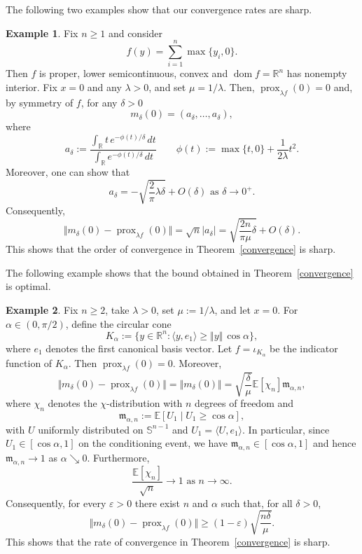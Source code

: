\documentclass[11pt]{amsart}
\newcommand{\1}{\mathds{1}}
\theoremstyle{definition}
\theoremstyle{remark}
\theoremstyle{definition}
\newtheorem{example}{Example}[section]
\begin{document}
The following two examples show that our convergence rates are sharp.
\begin{example}
    Fix $n\geq 1$ and consider
    $$
    f(y)=\sum_{i=1}^n \max\{y_i,0\}.
    $$
    Then $f$ is proper, lower semicontinuous, convex and $\operatorname{dom}f=\mathbb{R}^n$ has nonempty interior. Fix $x=0$ and any $\lambda>0$, and set $\mu=1/\lambda$. Then, $\operatorname{prox}_{\lambda f}(0)=0$ and, by symmetry of $f$, for any $\delta>0$
    $$
    m_{\delta}(0)=(a_{\delta},\ldots,a_{\delta}),
    $$
    where 
    $$
    a_{\delta}:=\frac{\int_{\mathbb{R}}t\,e^{-\phi(t)/\delta}\,dt}{\int_{\mathbb{R}}e^{-\phi(t)/\delta}\,dt} \qquad \phi(t):=\max\{t,0\}+\frac{1}{2\lambda}t^2.
    $$
    Moreover, one can show that 
    $$
    a_{\delta}=-\sqrt{\frac{2}{\pi}\lambda \delta}+O(\delta) \textrm{ as } \delta \to 0^+.
    $$
    Consequently,
    $$
    \Vert m_{\delta}(0)-\operatorname{prox}_{\lambda f}(0)\Vert =\sqrt{n}\vert a_{\delta}\vert=\sqrt{\frac{2n}{\pi \mu}\delta}+O(\delta).
    $$
    This shows that the order of convergence in Theorem~\ref{convergence} is sharp.
\end{example}
The following example shows that the bound obtained in Theorem~\ref{convergence} is optimal.
\begin{example} Fix $n\geq 2$, take $\lambda>0$, set $\mu:=1/\lambda$, and let $x=0$. For $\alpha\in (0,\pi/2)$, define the circular cone
$$
K_{\alpha}:=\{y\in \mathbb{R}^n \colon \langle y,e_1\rangle \geq \Vert y\Vert\, \cos \alpha\},
$$
where $e_1$ denotes the first canonical basis vector. 
Let $f=\iota_{K_{\alpha}}$ be the indicator function of $K_{\alpha}$. Then $\operatorname{prox}_{\lambda f}(0)=0$. Moreover,
$$
\Vert m_{\delta}(0)-\operatorname{prox}_{\lambda f}(0)\Vert =\Vert m_{\delta}(0)\Vert=\sqrt{\frac{\delta}{\mu}} \mathbb{E}[\chi_n] \mathfrak{m}_{\alpha,n},
$$
where $\chi_n$ denotes the $\chi$-distribution with $n$ degrees of freedom and 
$$
\mathfrak{m}_{\alpha,n}:=\mathbb{E}\left[U_1 \mid U_1\geq \cos \alpha\right],
$$
with $U$ uniformly distributed on $\mathbb{S}^{n-1}$ and $U_1=\langle U,e_1\rangle$. In particular, since $U_1\in [\cos \alpha,1]$ on the conditioning event, we have $\mathfrak{m}_{\alpha,n}\in [\cos \alpha,1]$ and hence   $\mathfrak{m}_{\alpha,n}\to 1$ as $\alpha \searrow 0$. Furthermore, 
$$
\frac{\mathbb{E}[\chi_n]}{\sqrt{n}}\to 1 \textrm{ as  } n\to \infty.
$$
Consequently, for every $\varepsilon>0$ there exist $n$ and $\alpha$ such that, for all $\delta>0$, 
$$
\Vert m_{\delta}(0)-\operatorname{prox}_{\lambda f}(0)\Vert \geq (1-\varepsilon)\sqrt{\frac{n\delta}{\mu}}.
$$
This shows that the rate of convergence in Theorem~\ref{convergence} is sharp.
\end{example}
\end{document}
